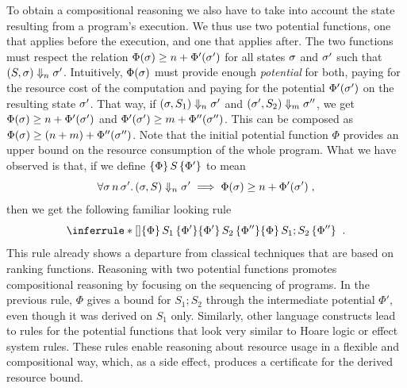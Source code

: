 \documentclass{sigplanconf}
\begin{document}
To obtain a compositional reasoning we also have to take into account the
state resulting from a program's execution.  We thus use two potential
functions, one that applies before the execution, and one that applies
after.  The two functions must respect the relation $\Phi(\sigma)
\ge n + \Phi'(\sigma')$ for all states $\sigma$ and $\sigma'$ such
that $(S, \sigma) \Downarrow_n \sigma'$.  Intuitively, $\Phi(\sigma)$
must provide enough \emph{potential} for both, paying for the resource
cost of the computation and paying for the potential $\Phi'(\sigma')$ on
the resulting state $\sigma'$. That way, if $(\sigma, S_1) \Downarrow_n
\sigma'$ and $(\sigma', S_2) \Downarrow_m \sigma''$, we get $\Phi(\sigma)
\ge n + \Phi'(\sigma')$ and $\Phi'(\sigma') \ge m + \Phi''(\sigma'')$.
This can be composed as $\Phi(\sigma) \ge (n + m) + \Phi''(\sigma'')$.
Note that the initial potential function $\Phi$ provides an upper bound
on the resource consumption of the whole program.  What we have observed
is that, if we define $\{\Phi\}\, S\, \{\Phi'\}$ to mean
$$
\forall \sigma\, n\, \sigma'.\, (\sigma, S) \Downarrow_n \sigma' \implies \Phi(\sigma) \ge
n + \Phi'(\sigma') \; ,
$$
then we get the following familiar looking rule
$$
\RuleNolabel
{\htriple{\Phi}{S_1}{\Phi'} \\ \htriple{\Phi'}{S_2}{\Phi''}}
{\htriple{\Phi} {S_1; S_2}  {\Phi''}} \;\; .
$$
%
This rule already shows a departure from classical techniques that are
based on ranking functions.  Reasoning with two potential functions
promotes compositional reasoning by focusing on the sequencing of
programs.  In the previous rule, $\Phi$ gives a bound for
$S_1; S_2$ through the intermediate potential $\Phi'$, even though it
was derived on $S_1$ only.
%
Similarly, other language constructs lead to rules for the potential
functions that look very similar to Hoare logic or effect system
rules.  These rules enable reasoning about resource usage
in a flexible and compositional way, which, as a side effect, produces
a certificate for the derived resource bound.



\end{document}
